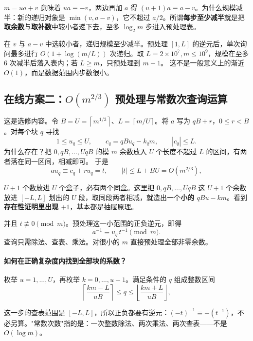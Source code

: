 \documentclass[UTF8,a4paper,11pt,twoside,openright,fontset=fandol]{ctexbook}
\theoremstyle{definition}
\newcommand{\floor}[1]{\left\lfloor #1\right\rfloor}
\newcommand{\ceil}[1]{\left\lceil #1\right\rceil}
\begin{document}
\begin{tip}[这个恒等式从哪来]
$m=ua+v$ 意味着 $ua\equiv-v$，两边再加 $a$ 得 $(u+1)a\equiv a-v$。为什么规模减半：新的递归对象是 $\min(v,a-v)$，它不超过 $a/2$。所谓\textbf{每步至少减半}就是把\textbf{取余数}与\textbf{取补数}中较小者递下去，至多 $\log_2 m$ 步进入预处理表。
\end{tip}

在 $v$ 与 $a-v$ 中选较小者，递归规模至少减半。预处理 $[1,L]$ 的逆元后，单次询问最多进行 $O(1+\log(m/L))$ 次递归。取 $L=2\times10^7,m\le10^9$，规模在至多 $6$ 次减半后落入表内；若 $L\ge m$，只预处理到 $m-1$。
这不是一般意义上的渐近 $O(1)$，而是数据范围内步数很小。

\subsection{在线方案二：\texorpdfstring{$O(m^{2/3})$}{O(m2/3)} 预处理与常数次查询运算}
这是选修内容。令 $B=U=\ceil{m^{1/3}}$、$L=\ceil{m/U}$。将 $a$ 写为 $qB+r$，$0\le r<B$。对每个块 $q$ 寻找
\[
1\le u_q\le U,\qquad c_q=qBu_q-k_qm,\qquad |c_q|\le L.
\]
为什么存在？把 $0,qB,\ldots,UqB$ 的模 $m$ 余数放入 $U$ 个长度不超过 $L$ 的区间，有两者落在同一区间，相减即可。
于是
\[
 a u_q\equiv c_q+ru_q=t,\qquad |t|\le L+BU=O(m^{2/3}),
\]

\begin{tip}[抽屉原理一句话]
$U+1$ 个数放进 $U$ 个盒子，必有两个同盒。这里把 $0,qB,\ldots,UqB$ 这 $U+1$ 个余数放进 $[-L,L]$ 划出的 $U$ 段，取同段两者相减，就造出一个\textbf{小的 $qBu-km$}。看到\textbf{存在性证明里出现 $+1$}，基本都是抽屉原理。
\end{tip}

并且 $t\not\equiv0\pmod m$。预处理这一小范围的正负逆元，即得
\[
 a^{-1}\equiv u_q\,t^{-1}\pmod m.
\]
查询只需除法、查表、乘法。对很小的 $m$ 直接预处理全部非零余数。

\paragraph{如何在正确复杂度内找到全部块的系数？}
枚举 $u=1,\ldots,U$，再枚举 $k=0,\ldots,u+1$。满足条件的 $q$ 组成整数区间
\[
 \ceil{\frac{km-L}{uB}}\le q\le\floor{\frac{km+L}{uB}},
\]

\begin{tip}
这一步的查表范围是 $[-L,L]$，所以正负都要有逆元：$(-t)^{-1}\equiv-(t^{-1})$，不必另算。"常数次数"指的是：一次整数除法、两次乘法、两次查表——不是 $O(\log m)$。
\end{tip}
\end{document}
